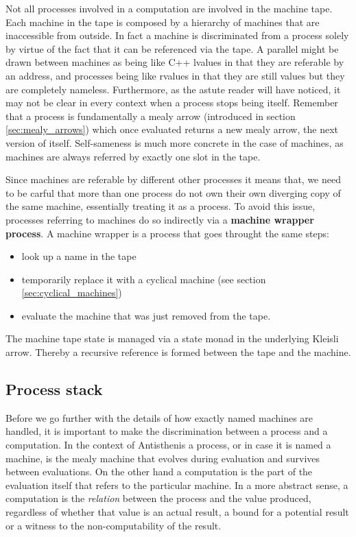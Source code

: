 Not all processes involved in a computation are involved in the
machine tape. Each machine in the tape is composed by a hierarchy of
machines that are inaccessible from outside. In fact a machine is
discriminated from a process solely by virtue of the fact that it can
be referenced via the tape. A parallel might be drawn between machines
as being like C++ lvalues in that they are referable by an address,
and processes being like rvalues in that they are still values but
they are completely nameless. Furthermore, as the astute reader will
have noticed, it may not be clear in every context when a process
stops being itself. Remember that a process is fundamentally a mealy
arrow (introduced in section \ref{sec:mealy_arrows}) which once
evaluated returns a new mealy arrow, the next version of
itself. Self-sameness is much more concrete in the case of machines,
as machines are always referred by exactly one slot in the tape.

Since machines are referable by different other processes it means
that, we need to be carful that more than one process do not own their
own diverging copy of the same machine, essentially treating it as a
process. To avoid this issue, processes referring to machines do so
indirectly via a \textbf{machine wrapper process}. A machine wrapper
is a process that goes throught the same steps:

\begin{itemize}
\item look up a name in the tape
\item temporarily replace it with a cyclical machine (see section
  \ref{sec:cyclical_machines})
\item evaluate the machine that was just removed from the tape.
\end{itemize}

The machine tape state is managed via a state monad in the underlying
Kleisli arrow. Thereby a recursive reference is formed between the
tape and the machine.

\subsection{Process stack}
\label{sec:process_stack}

Before we go further with the details of how exactly named machines
are handled, it is important to make the discrimination between a
process and a computation. In the context of Antisthenis a process, or
in case it is named a machine, is the mealy machine that evolves
during evaluation and survives between evaluations. On the other hand
a computation is the part of the evaluation itself that refers to the
particular machine. In a more abstract sense, a computation is the
\emph{relation} between the process and the value produced, regardless
of whether that value is an actual result, a bound for a potential
result or a witness to the non-computability of the result.

